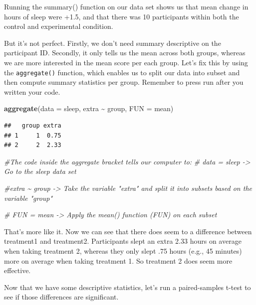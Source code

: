 \documentclass[
]{book}
\newenvironment{Shaded}{\begin{snugshade}}{\end{snugshade}}
\newcommand{\AttributeTok}[1]{\textcolor[rgb]{0.13,0.29,0.53}{#1}}
\newcommand{\CommentTok}[1]{\textcolor[rgb]{0.56,0.35,0.01}{\textit{#1}}}
\newcommand{\FunctionTok}[1]{\textcolor[rgb]{0.13,0.29,0.53}{\textbf{#1}}}
\newcommand{\NormalTok}[1]{#1}
\newcommand{\SpecialCharTok}[1]{\textcolor[rgb]{0.81,0.36,0.00}{\textbf{#1}}}
\begin{document}
Running the summary() function on our data set shows us that mean change in hours of sleep were +1.5, and that there was 10 participants within both the control and experimental condition.

But it's not perfect. Firstly, we don't need summary descriptive on the participant ID. Secondly, it only tells us the mean across both groups, whereas we are more interested in the mean score per each group. Let's fix this by using the \texttt{aggregate()} function, which enables us to split our data into subset and then compute summary statistics per group. Remember to press run after you written your code.

\begin{Shaded}
\begin{Highlighting}[]
\FunctionTok{aggregate}\NormalTok{(}\AttributeTok{data =}\NormalTok{ sleep, extra }\SpecialCharTok{\textasciitilde{}}\NormalTok{ group, }\AttributeTok{FUN =}\NormalTok{ mean)}
\end{Highlighting}
\end{Shaded}

\begin{verbatim}
##   group extra
## 1     1  0.75
## 2     2  2.33
\end{verbatim}

\begin{Shaded}
\begin{Highlighting}[]
\CommentTok{\#The code inside the aggregate bracket tells our computer to: }
\CommentTok{\# data = sleep {-}\textgreater{} Go to the sleep data set}

\CommentTok{\#extra \textasciitilde{} group {-}\textgreater{} Take the variable "extra" and split it into subsets based on the variable "group"}

\CommentTok{\# FUN = mean {-}\textgreater{} Apply the mean() function (FUN) on each subset }
\end{Highlighting}
\end{Shaded}

That's more like it. Now we can see that there does seem to a difference between treatment1 and treatment2. Participants slept an extra 2.33 hours on average when taking treatment 2, whereas they only slept .75 hours (e.g., 45 minutes) more on average when taking treatment 1. So treatment 2 does seem more effective.

Now that we have some descriptive statistics, let's run a paired-samples t-test to see if those differences are significant.
\end{document}
